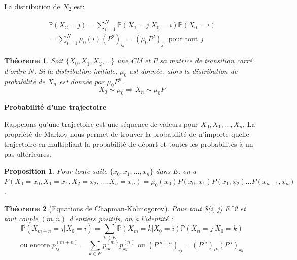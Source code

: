 \documentclass[
]{book}
\newtheorem{theorem}{Théoreme}[chapter]
\newtheorem{proposition}{Proposition}[chapter]
\theoremstyle{definition}
\theoremstyle{definition}
\theoremstyle{definition}
\theoremstyle{remark}
\begin{document}
La distribution de \(X_2\) est:

\begin{align*} 
\mathbb{P}(X_2 = j) = \sum_{i=1}^N \mathbb{P}(X_1 = j | X_0 = i)\mathbb{P}(X_0 = i) \\
=
\sum_{i=1}^N \mu_0(i) (P^2)_{ij}=(\mu_0 P^2)_j\; \text{ pour tout }j
\end{align*}

\begin{theorem}
\protect\hypertarget{thm:unnamed-chunk-34}{}{\label{thm:unnamed-chunk-34} }Soit \(\{X_0, X_1, X_2, \ldots \}\) une CM et \(P\) sa matrice de transition carré d'ordre \(N\). Si la distribution initiale, \(\mu_0\) est donnée, alors la distribution de probabilité de \(X_n\) est donnée par \(\mu_0 P^n\).
\[
X_0 \sim \mu_0 \Longrightarrow X_n \sim \mu_0 P
\]
\end{theorem}

\textbf{Probabilité d'une trajectoire}

Rappelons qu'une trajectoire est une séquence
de valeurs pour \(X_0, X_1,\ldots, X_n\). La propriété de Markov nous permet de trouver la probabilité de n'importe quelle trajectoire en multipliant la probabilité de départ et toutes les probabilités à un pas ultérieures.

\begin{proposition}
\protect\hypertarget{prp:unnamed-chunk-35}{}{\label{prp:unnamed-chunk-35} }Pour toute suite \(\{x_0, x_1, \ldots , x_n\}\) dans \(E\), on a
\(P(X_0 = x_0, X_1 = x_1,X_2 = x_2, \ldots , X_n = x_n) =\mu_0(x_0)P(x_0, x_1)P(x_1, x_2)\ldots P(x_{n−1}, x_n)\).
\end{proposition}

\begin{theorem}[Equations de Chapman-Kolmogorov]
\protect\hypertarget{thm:unnamed-chunk-36}{}{\label{thm:unnamed-chunk-36} {} }Pour tout \$(i, j) \in E\^{}2 et tout couple \((m, n)\) d'entiers positifs, on a l'identité :
\[
\mathbb{P}(X_{m+n} = j|X_0 = i) = \sum_{k\in E}
\mathbb{P}(X_m = k|X_0 = i)\mathbb{P}(X_n = j|X_0 = k)\]
\[\text{ou encore }
p^{(m+n)}_{ij} = \sum_{k \in E} p^{(m)}_{ik} p^{(n)}_{kj} \text{ ou } (P^{m+n})_{ij}=(P^m)_{ik}(P^n)_{kj}\]
\end{theorem}
\end{document}
